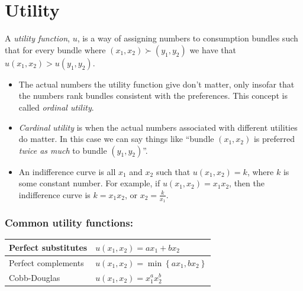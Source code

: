 \documentclass{article}
\begin{document}
\section{Utility}
A \emph{utility function}, $u$, is a way of assigning numbers to consumption bundles such that for every bundle where $\left( x_1,x_2 \right)\succ\left( y_1,y_2 \right)$ we have that $u\left( x_1,x_2 \right)>u\left( y_1,y_2 \right)$.
\begin{itemize}
  \item The actual numbers the utility function give don't matter, only insofar that the numbers rank bundles consistent with the preferences. This concept is called \emph{ordinal utility}.
  \item \emph{Cardinal utility} is when the actual numbers associated with different utilities do matter. In this case we can say things like ``bundle $\left( x_1,x_2 \right)$ is preferred \emph{twice as much} to bundle $\left( y_1,y_2 \right)$''.
  \item An indifference curve is all $x_1$ and $x_2$ such that $u\left( x_1,x_2 \right)=k$, where $k$ is some constant number. For example, if $u\left( x_1,x_2 \right)=x_1x_2$, then the indifference curve is $k=x_1x_2$, or $x_2=\frac{k}{x_1}$.
\end{itemize}
\subsubsection*{Common utility functions:}
\begin{center}
  \begin{tabular}{|l|l|}\hline
    Perfect substitutes & $u\left( x_1,x_2 \right)=ax_1 + bx_2$ \\\hline
    Perfect complements & $u\left( x_1,x_2 \right)=\min\left\{ ax_1,bx_2
    \right\}$ \\\hline
    Cobb-Douglas & $u\left( x_1,x_2 \right)=x_1^a x_2^b$ \\\hline
  \end{tabular}
\end{center}
\end{document}

